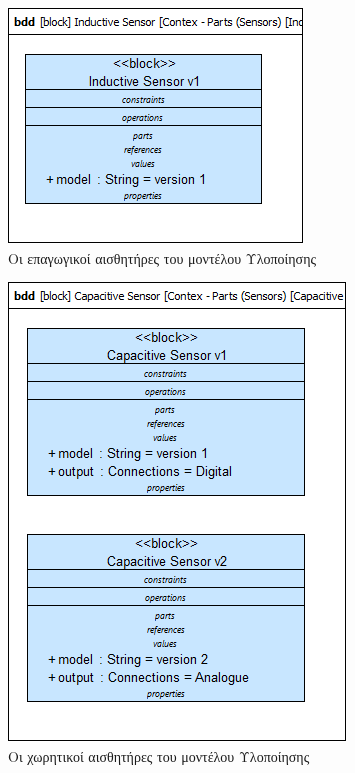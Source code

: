 \documentclass[a4paper,12pt,twoside]{report}
\begin{document}
{\begin{appendices}
				\begin{figure}[hp]
					\centering
					\includegraphics[scale=0.50]{DesignModel_Contex-Parts(Sensors)[InductiveSensor].png}
					\caption{Οι επαγωγικοί αισθητήρες του μοντέλου Υλοποίησης}
					\label{φωτ:Οι επαγωγικοί αισθητήρες του μοντέλου Υλοποίησης}
				\end{figure}
				
				\begin{figure}[hp]
					\centering
					\includegraphics[scale=0.50]{DesignModel_Contex-Parts(Sensors)[CapacitiveSensors].png}
					\caption{Οι χωρητικοί αισθητήρες του μοντέλου Υλοποίησης}
					\label{φωτ:Οι χωρητικοί αισθητήρες του μοντέλου Υλοποίησης}
				\end{figure}
				

\end{appendices}}
\end{document}

